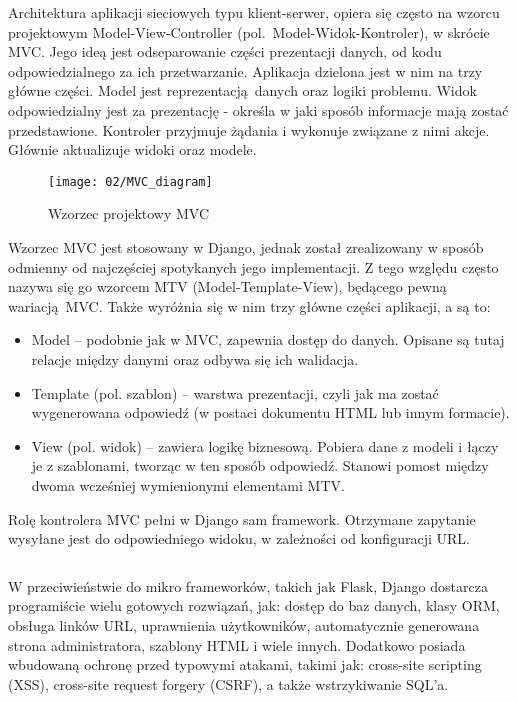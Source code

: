 Architektura aplikacji sieciowych typu klient-serwer, opiera się często na wzorcu projektowym Model-View-Controller (pol.~Model-Widok-Kontroler), w skrócie MVC. Jego ideą jest odseparowanie części prezentacji danych, od kodu odpowiedzialnego za ich przetwarzanie. Aplikacja dzielona jest w nim na trzy główne części. Model jest reprezentacją danych oraz logiki problemu. Widok odpowiedzialny jest za prezentację - określa w jaki sposób informacje mają zostać przedstawione. Kontroler przyjmuje żądania i wykonuje związane z nimi akcje. Głównie aktualizuje widoki oraz modele.

\begin{figure}[h]
	\begin{center}
		\texttt{[image: 02/MVC\_diagram]}
	\end{center}
	\caption{Wzorzec projektowy MVC}
	\vspace{-0.3cm}
\end{figure}

Wzorzec MVC jest stosowany w Django, jednak został zrealizowany w sposób odmienny od najczęściej spotykanych jego implementacji. Z tego względu często nazywa się go wzorcem MTV (Model-Template-View), będącego pewną wariacją MVC. Także wyróżnia się w nim trzy główne części aplikacji, a są to:
\begin{itemize}
	\item Model -- podobnie jak w MVC, zapewnia dostęp do danych. Opisane są tutaj relacje między danymi oraz odbywa się ich walidacja.
	\item Template (pol. szablon) -- warstwa prezentacji, czyli jak ma zostać wygenerowana odpowiedź (w postaci dokumentu HTML lub innym formacie).
	\item View (pol. widok) -- zawiera logikę biznesową. Pobiera dane z modeli i łączy je z szablonami, tworząc w ten sposób odpowiedź. Stanowi pomost między dwoma wcześniej wymienionymi elementami MTV.
\end{itemize}
Rolę kontrolera MVC pełni w Django sam framework. Otrzymane zapytanie wysyłane jest do odpowiedniego widoku, w zależności od konfiguracji URL.

\begin{singlespace}
	\vspace{0.3cm}
	\inputminted[fontsize=\footnotesize]{python}{src/urls.py}
	\label{l:url}
\end{singlespace}

W przeciwieństwie do mikro frameworków, takich jak Flask, Django dostarcza programiście wielu gotowych rozwiązań, jak: dostęp do baz danych, klasy ORM, obsługa linków URL, uprawnienia użytkowników, automatycznie generowana strona administratora, szablony HTML i wiele innych. Dodatkowo posiada wbudowaną ochronę przed typowymi atakami, takimi jak: cross-site scripting (XSS), cross-site request forgery (CSRF), a także wstrzykiwanie SQL'a.

